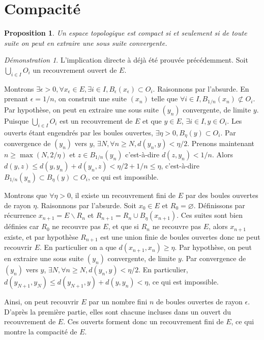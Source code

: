 \documentclass[a4paper, 11pt, french]{book}
\theoremstyle{plain} %
\newtheorem{proposition}{Proposition}
\theoremstyle{definition} %
\theoremstyle{remark} %
\newtheorem*{demonstration}{Démonstration}
\renewcommand{\setminus}{\backslash}
\newcommand{\1}{\mathds{1}}
\newcommand\vide{\varnothing}
\begin{document}
\section{Compacité}

\begin{proposition}
	Un espace topologique est compact si et seulement si de toute suite on peut en extraire une sous suite convergente.
\end{proposition}

\begin{demonstration}
	L'implication directe à déjà été prouvée précédemment.
	Soit $\bigcup_{i\in I}O_i$ un recouvrement ouvert de $E$.

	Montrons $\exists\epsilon>0, \forall x_\epsilon\in E, \exists i\in I, B_\epsilon(x_\epsilon)\subset O_i$.
	Raisonnons par l'absurde.
	En prenant $\epsilon=1/n$, on construit une suite $(x_n)$ telle que $\forall i\in I, B_{1/n}(x_n)\not\subset O_i$.
	Par hypothèse, on peut en extraire une sous suite $(y_n)$ convergente, de limite $y$.
	Puisque $\bigcup_{i\in I}O_i$ est un recouvrement de $E$ et que $y\in E$, $\exists i\in I, y\in O_i$.
	Les ouverts étant engendrés par les boules ouvertes, $\exists\eta>0, B_\eta(y)\subset O_i$.
	Par convergence de $(y_n)$ vers $y$, $\exists N, \forall n\geqslant N, d(y_n, y)<\eta/2$.
	Prenons maintenant $n\geqslant\max(N, 2/\eta)$ et $z\in B_{1/n}(y_n)$ c'est-à-dire $d(z, y_n)<1/n$.
	Alors $d(y, z)\leqslant d(y, y_n)+d(y_n, z)<\eta/2+1/n\leqslant\eta$, c'est-à-dire $B_{1/n}(y_n)\subset B_\eta(y)\subset O_i$, ce qui est impossible.

	Montrons que $\forall\eta>0$, il existe un recouvrement fini de $E$ par des boules ouvertes de rayon $\eta$.
	Raisonnons par l'absurde.
	Soit $x_0\in E$ et $R_0=\vide$.
	Définissons par récurrence $x_{n+1}=E\setminus R_n$ et $R_{n+1}=R_n\cup B_\eta(x_{n+1})$.
	Ces suites sont bien définies car $R_0$ ne recouvre pas $E$, et que si $R_n$ ne recouvre pas $E$, alors $x_{n+1}$ existe, et par hypothèse $R_{n+1}$ est une union finie de boules ouvertes donc ne peut recouvrir $E$.
	En particulier on a que $d(x_{n+1}, x_n)\geqslant\eta$.
	Par hypothèse, on peut en extraire une sous suite $(y_n)$ convergente, de limite $y$.
	Par convergence de $(y_n)$ vers $y$, $\exists N, \forall n\geqslant N, d(y_n, y)<\eta/2$.
	En particulier, $d(y_{N+1}, y_N)\leqslant d(y_{N+1}, y)+d(y, y_n)<\eta$, ce qui est impossible.

	Ainsi, on peut recouvrir $E$ par un nombre fini $n$ de boules ouvertes de rayon $\epsilon$.
	D'après la première partie, elles sont chacune incluses dans un ouvert du recouvrement de $E$.
	Ces ouverts forment donc un recouvrement fini de $E$, ce qui montre la compacité de $E$.
\end{demonstration}
\end{document}
